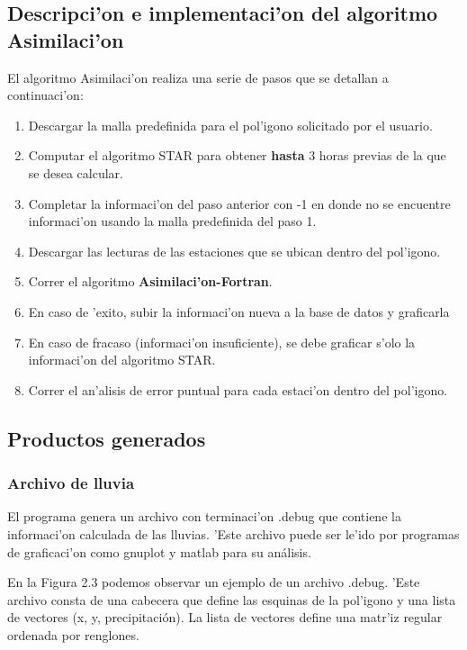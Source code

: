 \subsection{Descripci'on e implementaci'on del algoritmo Asimilaci'on}
El algoritmo Asimilaci'on realiza una serie de pasos que se detallan a continuaci'on:
\begin{enumerate}
 \item Descargar la malla predefinida para el pol'igono solicitado por el usuario.
  \item Computar el algoritmo STAR para obtener \textbf{hasta} 3 horas previas de la que se desea calcular.
  \item Completar la informaci'on del paso anterior con -1 en donde no se encuentre informaci'on usando la malla predefinida del paso 1.
  \item Descargar las lecturas de las estaciones que se ubican dentro del pol'igono.
  \item Correr el algoritmo \textbf{Asimilaci'on-Fortran}.
  \item En caso de 'exito, subir la informaci'on nueva a la base de datos y graficarla
  \item En caso de fracaso (informaci'on insuficiente), se debe graficar s'olo la informaci'on del algoritmo STAR.
  \item Correr el an'alisis de error puntual para cada estaci'on dentro del pol'igono.
\end{enumerate}

\subsection{Productos generados}
\subsubsection*{Archivo de lluvia}
El programa genera un archivo con terminaci'on .debug que contiene la informaci'on calculada de las lluvias.
'Este archivo puede ser le'ido por programas de graficaci'on como gnuplot y matlab para su análisis.

En la Figura 2.3 podemos observar un ejemplo de un archivo .debug. 'Este archivo
consta de una cabecera que define las esquinas de la pol'igono y una lista de vectores (x, y, precipitación). La
lista de vectores define una matr'iz regular ordenada por renglones.

